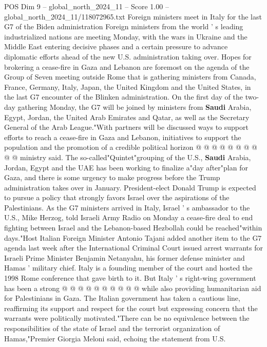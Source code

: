 \begin{textsample}{POS Dim 9 – global\_north\_2024\_11 – Score 1.00 – global\_north\_2024\_11/118072965.txt}  \label{ex:f9_pos_240}
Foreign ministers meet in Italy for the last G7 of the Biden administration Foreign ministers from the world ' s leading industrialized nations are meeting Monday, with the wars in Ukraine and the Middle East entering decisive phases and a certain pressure to advance diplomatic efforts ahead of the new U.S. administration taking over.
Hopes for brokering a cease-fire in Gaza and Lebanon are foremost on the agenda of the Group of Seven meeting outside Rome that is gathering ministers from Canada, France, Germany, Italy, Japan, the United Kingdom and the United States, in the last G7 encounter of the Blinken administration.
On the first day of the two-day gathering Monday, the G7 will be joined by ministers from \textbf{Saudi} Arabia, Egypt, Jordan, the United Arab Emirates and Qatar, as well as the Secretary General of the Arab League."With partners will be discussed ways to support efforts to reach a cease-fire in Gaza and Lebanon, initiatives to support the population and the promotion of a credible political horizon @ @ @ @ @ @ @ @ @ @ ministry said.
The so-called"Quintet"grouping of the U.S., \textbf{Saudi} Arabia, Jordan, Egypt and the UAE has been working to finalize a"day after"plan for Gaza, and there is some urgency to make progress before the Trump administration takes over in January.
President-elect Donald Trump is expected to pursue a policy that strongly favors Israel over the aspirations of the Palestinians.
As the G7 ministers arrived in Italy, Israel ' s ambassador to the U.S., Mike Herzog, told Israeli Army Radio on Monday a cease-fire deal to end fighting between Israel and the Lebanon-based Hezbollah could be reached"within days."Host Italian Foreign Minister Antonio Tajani added another item to the G7 agenda last week after the International Criminal Court issued arrest warrants for Israeli Prime Minister Benjamin Netanyahu, his former defense minister and Hamas ' military chief.
Italy is a founding member of the court and hosted the 1998 Rome conference that gave birth to it.
But Italy ' s right-wing government has been a strong @ @ @ @ @ @ @ @ @ @ while also providing humanitarian aid for Palestinians in Gaza.
The Italian government has taken a cautious line, reaffirming its support and respect for the court but expressing concern that the warrants were politically motivated."There can be no equivalence between the responsibilities of the state of Israel and the terrorist organization of Hamas,"Premier Giorgia Meloni said, echoing the statement from U.S.

\end{textsample}
